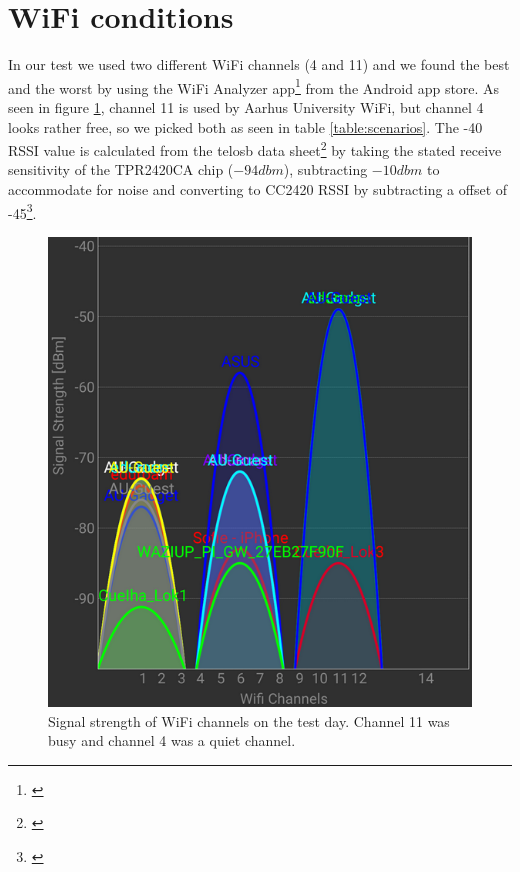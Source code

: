 \section{WiFi conditions}\label{sc:wifi}
In our test we used two different WiFi channels (4 and 11) and we found the best and the worst by using the WiFi Analyzer app\footnote{\cite{wifi}} from the Android app store. As seen in figure \ref{fig:wifionthetestday}, channel 11 is used by Aarhus University WiFi, but channel 4 looks rather free, so we picked both as seen in table \ref{table:scenarios}. The -40 RSSI value is calculated from the telosb data sheet\footnote{\cite{CrossbowTechnologyInc.2004}} by taking the stated receive sensitivity of the TPR2420CA chip ($-94dbm$), subtracting $-10dbm$ to accommodate for noise and converting to CC2420 RSSI by subtracting a offset of -45\footnote{\cite{Ieee}}.

\begin{figure}[h]
	\centering
	\includegraphics[width=1\linewidth]{testAndPerformance/wifi/wifiOnTheTestDay}
	\caption{Signal strength of WiFi channels on the test day. Channel 11 was busy and channel 4 was a quiet channel.}
	\label{fig:wifionthetestday}
\end{figure}
